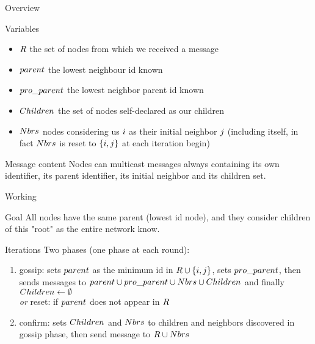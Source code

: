 \documentclass[10pt, compress]{beamer}
\begin{document}

\begin{frame}{Overview}

\begin{block}{Variables}
\begin{itemize}
\item $\mathnormal{R}$ the set of nodes from which we received a message
\item $\mathnormal{parent}$ the lowest neighbour id known
\item $\mathnormal{pro\_parent}$ the lowest neighbor parent id known 
\item $\mathnormal{Children}$ the set of nodes self-declared as our children
\item $\mathnormal{Nbrs}$ nodes considering us $\mathnormal{i}$ as their initial neighbor $\mathnormal{j}$ (including itself, in fact $\mathnormal{Nbrs}$ is reset to $\mathnormal{\{i, j\}}$ at each iteration begin)
\end{itemize}
\end{block}

\begin{block}{Message content}
Nodes can multicast messages always containing its own identifier, its parent identifier, its initial neighbor and its children set.
\end{block}

\end{frame}


\begin{frame}{Working}

\begin{block}{Goal}
All nodes have the same parent (lowest id node), and they consider children of this "root" as the entire network know.
\end{block}

\begin{block}{Iterations}
Two phases (one phase at each round):
\begin{enumerate}
\item{\alert{gossip}: sets $\mathnormal{parent}$ as the minimum id in $\mathnormal{R \cup \{i, j\}}$, sets $\mathnormal{pro\_parent}$, then sends messages to $\mathnormal{parent \cup pro\_parent \cup  Nbrs \cup Children}$ and finally $\mathnormal{Children} \leftarrow \emptyset$\\
\textit{or} \alert{reset}: if $\mathnormal{parent}$ does not appear in $\mathnormal{R}$}
\item{\alert{confirm}: sets $\mathnormal{Children}$ and $\mathnormal{Nbrs}$ to children and neighbors discovered in \alert{gossip} phase, then send message to $\mathnormal{R \cup Nbrs}$}
\end{enumerate}
\end{block}

\end{frame}
\end{document}
